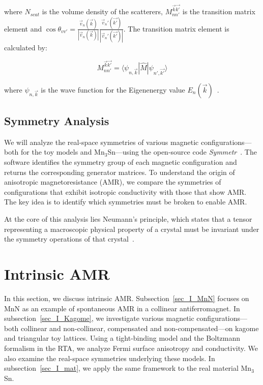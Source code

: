 \documentclass[prb,showpacs,amsmath,amssymb,superscriptaddress,twocolumn,floatfix]{revtex4-1}
\begin{document}
where $N_{scat}$ is the volume density of the scatterers, $M^{\vec{k}\vec{k'}}_{nn'}$ is the transition matrix element and $\cos \theta_{vv'} = \frac{\vec{v}_n (\vec{k})}{|\vec{v}_n (\vec{k})|}\frac{\vec{v}_n' (\vec{k'})}{|\vec{v}_n' (\vec{k'})|}$. The transition matrix element is calculated by:

\begin{equation}
	M^{\vec{k}\vec{k'}}_{nn'} = \langle \psi_{n, \vec{k}}|\hat{M}|\psi_{n', \vec{k'}} \rangle
	\label{eq_transmatrix}
\end{equation}

where $\psi_{n, \vec{k}}$ is the wave function for the Eigenenergy value $E_n(\vec{k})$~\cite{Vyborny:2009}. 


\subsection{Symmetry Analysis}
We will analyze the real-space symmetries of various magnetic configurations—both for the toy models and Mn$_3$Sn—using the open-source code \textit{Symmetr}~\cite{Symmetr}. The software identifies the symmetry group of each magnetic configuration and returns the corresponding generator matrices. To understand the origin of anisotropic magnetoresistance (AMR), we compare the symmetries of configurations that exhibit isotropic conductivity with those that show AMR. The key idea is to identify which symmetries must be broken to enable AMR.

At the core of this analysis lies Neumann’s principle, which states that a tensor representing a macroscopic physical property of a crystal must be invariant under the symmetry operations of that crystal~\cite{Ritzinger:2021}.


\section{Intrinsic AMR}
\label{sec_intrinsic}

In this section, we discuss intrinsic AMR. Subsection~\ref{sec_I_MnN} focuses on MnN as an example of spontaneous AMR in a collinear antiferromagnet. In subsection~\ref{sec_I_Kagome}, we investigate various magnetic configurations—both collinear and non-collinear, compensated and non-compensated—on kagome and triangular toy lattices. Using a tight-binding model and the Boltzmann formalism in the RTA, we analyze Fermi surface anisotropy and conductivity. We also examine the real-space symmetries underlying these models. In subsection~\ref{sec_I_mat}, we apply the same framework to the real material Mn$_3$Sn. 
\end{document}
